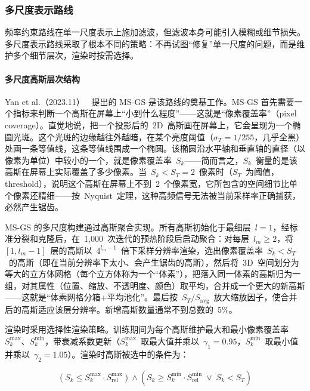\subsubsection{多尺度表示路线}

频率约束路线在单一尺度表示上施加滤波，但滤波本身可能引入模糊或细节损失。多尺度表示路线采取了根本不同的策略：不再试图“修复”单一尺度的问题，而是维护多个细节层次，渲染时按需选择。

\paragraph{多尺度高斯层次结构}

Yan et al.（2023.11）~\cite{2311_17089} 提出的 MS-GS 是该路线的奠基工作。MS-GS 首先需要一个指标来判断一个高斯在屏幕上“小到什么程度”——这就是“像素覆盖率”（pixel coverage）。直觉地说，把一个投影后的~2D~高斯画在屏幕上，它会呈现为一个椭圆光斑。这个光斑的边缘越往外越暗，在某个亮度阈值（$\sigma_T = 1/255$，几乎全黑）处画一条等值线，这条等值线围成一个椭圆。该椭圆沿水平轴和垂直轴的直径（以像素为单位）中较小的一个，就是像素覆盖率~$S_k$——简而言之，$S_k$~衡量的是该高斯在屏幕上实际覆盖了多少像素。当~$S_k < S_T = 2$~像素时（$S_T$~为阈值，threshold），说明这个高斯在屏幕上不到~2~个像素宽，它所包含的空间细节比单个像素还精细——按~Nyquist~定理，这种高频信号无法被当前采样率正确捕获，必然产生锯齿。

MS-GS 的多尺度构建通过高斯聚合实现。所有高斯初始化于最细层~$l=1$，经标准分裂和克隆后，在~1,000~次迭代的预热阶段后启动聚合：对每层~$l_m \geq 2$，将~$[1, l_m{-}1]$~层的高斯以~$4^{l_m-1}$~倍下采样分辨率渲染，选出像素覆盖率~$S_k < S_T$~的高斯（即在当前分辨率下太小、会产生锯齿的高斯），然后将~3D~空间划分为等大的立方体网格（每个立方体称为一个“体素”），把落入同一体素的高斯归为一组，对其属性（位置、缩放、不透明度、颜色）取平均，合并成一个更大的新高斯——这就是“体素网格分箱+平均池化”。最后按~$S_T / S_{\text{avg}}$~放大缩放因子，使合并后的高斯适应该层分辨率。新增高斯数量通常不到总数的~5\%。

渲染时采用选择性渲染策略。训练期间为每个高斯维护最大和最小像素覆盖率~$S_k^{\max}$、$S_k^{\min}$，带衰减系数更新（$S_k^{\max}$~取最大值并乘以~$\gamma_1 = 0.95$，$S_k^{\min}$~取最小值并乘以~$\gamma_2 = 1.05$）。渲染时高斯被选中的条件为：

\begin{equation}
\left(S_k \leq S_k^{\max} \cdot S_{\text{rel}}^{\max}\right) \wedge \left(S_k \geq S_k^{\min} \cdot S_{\text{rel}}^{\min} \;\vee\; S_k < S_T\right)
\end{equation}

